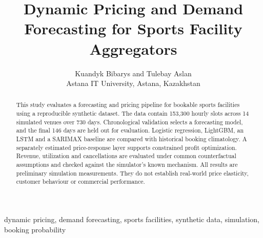 \documentclass[journal]{IEEEtran}
\begin{document}
\title{Dynamic Pricing and Demand Forecasting for Sports Facility Aggregators}
\author{Kuandyk Bibarys and Tulebay Aslan\\Astana IT University, Astana, Kazakhstan}
\maketitle
\begin{abstract}
This study evaluates a forecasting and pricing pipeline for bookable sports facilities using a reproducible synthetic dataset. The data contain 153,300 hourly slots across 14 simulated venues over 730 days. Chronological validation selects a forecasting model, and the final 146 days are held out for evaluation. Logistic regression, LightGBM, an LSTM and a SARIMAX baseline are compared with historical booking climatology. A separately estimated price-response layer supports constrained profit optimization. Revenue, utilization and cancellations are evaluated under common counterfactual assumptions and checked against the simulator's known mechanism. All results are preliminary simulation measurements. They do not establish real-world price elasticity, customer behaviour or commercial performance.
\end{abstract}
\begin{IEEEkeywords}
dynamic pricing, demand forecasting, sports facilities, synthetic data, simulation, booking probability
\end{IEEEkeywords}



\balance


\end{document}
